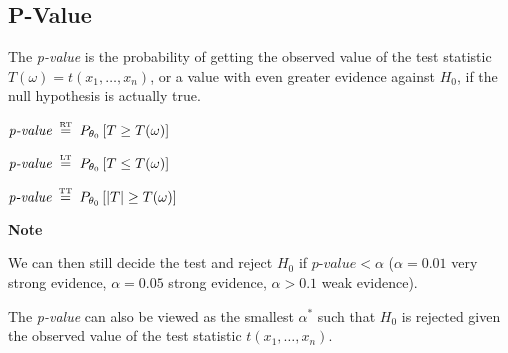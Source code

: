 \documentclass[8pt,a4paper]{extarticle}     %
\newcommand{\colnull}{\vfill\null\columnbreak}
\newcommand{\eqtxt}[1]{\mathrel{\stackrel{\makebox[0pt]{\mbox{\normalfont\tiny #1}}}{=}}}
\begin{document}
\begin{multicols}{4}
\subsection{P-Value}
\begin{boxdefinition}[P-Value] 
	The \textit{p-value} is the probability of getting the observed value of the test statistic $T(\omega)=t(x_1,\dots,x_n)$, or a value with even greater evidence against $H_0$, if the null hypothesis is actually true. 
	\begin{listb}
		\item $\textit{p-value} \ \eqtxt{RT} \ P_{\theta_0}\left[T \geq T(\omega)\right]$ 
		\item $\textit{p-value} \ \eqtxt{LT} \ P_{\theta_0}\left[T \leq T(\omega)\right]$ 
		\item $\textit{p-value} \ \eqtxt{TT} \ P_{\theta_0}\left[|T| \geq T(\omega)\right]$ 
	\end{listb}
\end{boxdefinition}
\begin{listb}
	\item [] \textbf{Note}
	\item We can then still decide the test and reject $H_0$ if $\textit{p-value}<\alpha$ ($\alpha=0.01$ very strong evidence, $\alpha=0.05$ strong evidence, $\alpha>0.1$ weak evidence). 
	\item The \textit{p-value} can also be viewed as the smallest $\alpha^*$ such that $H_0$ is rejected given the observed value of the test statistic $t(x_1,\dots,x_n)$. 
\end{listb}
\colnull


\end{multicols}
\end{document}
